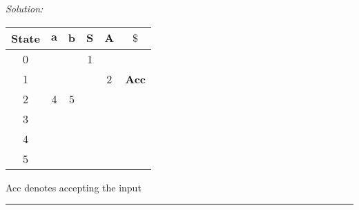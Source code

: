 \documentclass[a4paper, 11pt]{article}
\newenvironment{solution}
    {\textit{Solution:}}
    {}
\begin{document}
\begin{solution}
\begin{center}
\begin{tabular}{|c|c|c|c|c|c|}
\hline
State & \(\textbf{a}\) & \(\textbf{b}\) & \(\textbf{S}\) & \(\textbf{A}\) & \(\textbf{\$}\) \\
\hline
0 &  &  & 1 &  &  \\
1 &  &  &  & 2 & \textbf{Acc} \\
2 & 4 & 5 &  &  &  \\
3 &  &  &  &  &  \\
4 &  &  &  &  &  \\
5 &  &  &  &  &  \\
\hline
\end{tabular}
\end{center}

\noindent Acc denotes accepting the input

\end{solution}

\noindent\rule{7in}{2.8pt}
\end{document}
